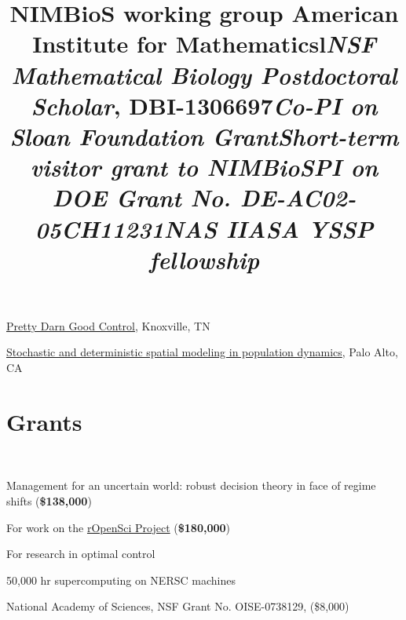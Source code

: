 \documentclass[margin]{res}
\begin{document}
\begin{resume}
\title{NIMBioS working group }
\begin{position}
\href{http://www.nimbios.org/workinggroups/WG_PDG}{Pretty Darn Good Control}, Knoxville, TN  
\vspace{-.25cm}
\end{position}

\title{American Institute for Mathematics}
\begin{position}
 \href{http://www.aimath.org/WWN/populationmodel}{Stochastic and deterministic spatial modeling in population dynamics}, Palo Alto, CA  \vspace{-.25cm}
\end{position}

 
\section{Grants}
\begin{format}
\title{l} \\
\body
\end{format}

\title{\emph{\textbf{NSF} Mathematical Biology Postdoctoral Scholar}, DBI-1306697}
\begin{position}
  Management for an uncertain world: robust decision theory in face of regime shifts (\textbf{\$138,000})
  \vspace{-.25cm}
\end{position}

\title{\emph{Co-PI on \textbf{Sloan Foundation} Grant}}
\begin{position}
  For work on the \href{http://ropensci.org}{rOpenSci Project}  (\textbf{\$180,000})
  \vspace{-.25cm}
\end{position}


\title{\emph{Short-term visitor grant to NIMBioS}}
\begin{position}
  For research in optimal control
  \vspace{-.25cm}
\end{position}

\title{\emph{PI on DOE Grant No. DE-AC02-05CH11231}}
\begin{position} 
50,000 hr supercomputing on NERSC machines
  \vspace{-.25cm}
\end{position}

\title{\emph{\textbf{NAS} IIASA YSSP fellowship}}
\begin{position} 
  National Academy of Sciences, NSF Grant No. OISE-0738129, (\$8,000)
  \vspace{-.25cm}
\end{position}


\end{resume}
\end{document}
